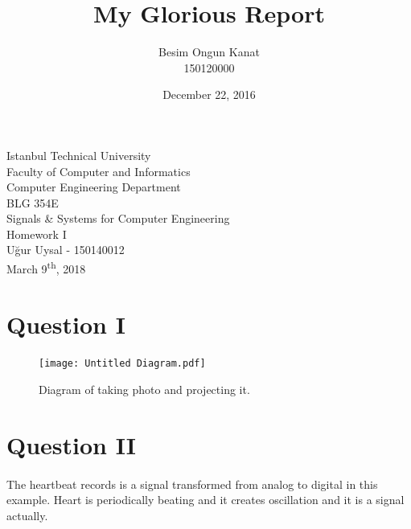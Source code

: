 \documentclass[a4paper, 12pt, titlepage]{article}
\title{My Glorious Report}
\author{Besim Ongun Kanat \\ 150120000}
\date{December 22, 2016}
\begin{document}


\begin{titlepage}
	\begin{center}
		\large{Istanbul Technical University \\ Faculty of Computer and Informatics \\ Computer Engineering Department} \\
		\vspace{150pt}
		\Large{BLG 354E \\Signals \& Systems for Computer Engineering  \\Homework I}  \\
		\vspace{30pt}
		\large{Uğur Uysal - 150140012} \\
		\vspace{\fill} %
		\large{March 9\textsuperscript{th}, 2018}
	\end{center}
\end{titlepage}
\newpage
\tableofcontents
\newpage

\section{Question I}
\begin{figure}[H]
	\centering
	\caption{Diagram of taking photo and projecting it. }
	\label{fig:Graphic}
	\texttt{[image: Untitled Diagram.pdf]} %
\end{figure}

\section{Question II}
\paragraph{} The heartbeat records is a signal transformed from analog to digital in this example. Heart is periodically beating and it creates oscillation and it is a signal actually.
\end{document}
